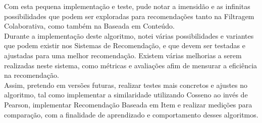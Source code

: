 \documentclass[12pt]{article}
\begin{document}
Com esta pequena implementação e teste, pude notar a imensidão e as infinitas possibilidades que podem ser exploradas para recomendações tanto na Filtragem Colaborativa, como também na Baseada em Conteúdo.\\
\indent Durante a implementação deste algoritmo, notei várias possibilidades e variantes que podem existir nos Sistemas de Recomendação, e que devem ser testadas e ajustadas para uma melhor recomendação. Existem várias melhorias a serem realizadas neste sistema, como métricas e avaliações afim de mensurar a eficiência na recomendação.\\
\indent Assim, pretendo em versões futuras, realizar testes mais concretos e ajustes no algoritmo, tal como implementar a similaridade utilizando Cosseno ao invés de Pearson, implementar Recomendação Baseada em Item e realizar medições para comparação, com a finalidade de aprendizado e comportamento desses algoritmos.

\newpage

\nocite{*}
\end{document}
